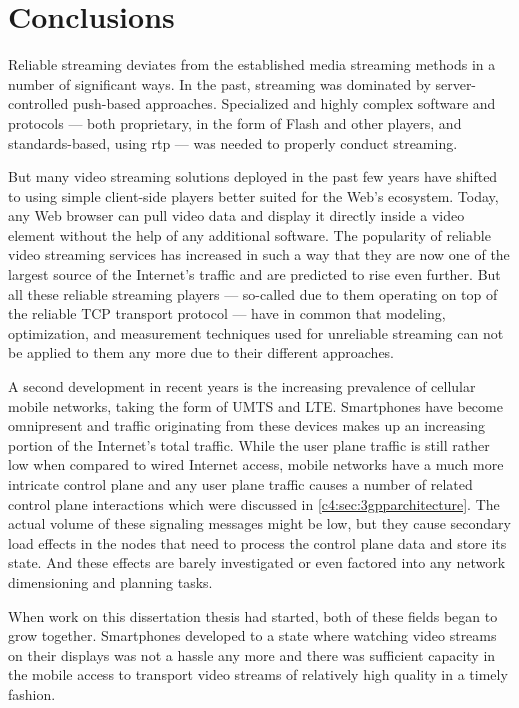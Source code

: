 \chapter{Conclusions}
\label{chap:conclusion}

Reliable streaming deviates from the established media streaming methods in a number of significant ways. In the past, streaming was dominated by server-controlled push-based approaches. Specialized and highly complex software and protocols --- both proprietary, in the form of Flash and other players, and standards-based, using \gls{rtp} --- was needed to properly conduct streaming. 

But many video streaming solutions deployed in the past few years have shifted to using simple client-side players better suited for the Web's ecosystem. Today, any Web browser can pull video data and display it directly inside a video element without the help of any additional software. The popularity of reliable video streaming services has increased in such a way that they are now one of the largest source of the Internet's traffic and are predicted to rise even further. But all these reliable streaming players --- so-called due to them operating on top of the reliable \gls{TCP} transport protocol --- have in common that modeling, optimization, and measurement techniques used for unreliable streaming can not be applied to them any more due to their different approaches.

A second development in recent years is the increasing prevalence of cellular mobile networks, taking the form of \gls{UMTS} and \gls{LTE}. Smartphones have become omnipresent and traffic originating from these devices makes up an increasing portion of the Internet's total traffic. While the user plane traffic is still rather low when compared to wired Internet access, mobile networks have a much more intricate control plane and any user plane traffic causes a number of related control plane interactions which were discussed in \ref{c4:sec:3gpparchitecture}. The actual volume of these signaling messages might be low, but they cause secondary load effects in the nodes that need to process the control plane data and store its state. And these effects are barely investigated or even factored into any network dimensioning and planning tasks.

When work on this dissertation thesis had started, both of these fields began to grow together. Smartphones developed to a state where watching video streams on their displays was not a hassle any more and there was sufficient capacity in the mobile access to transport video streams of relatively high quality in a timely fashion.

